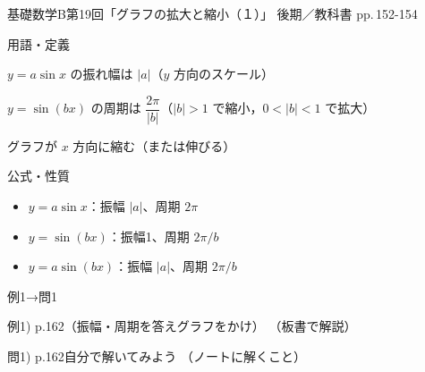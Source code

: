 \documentclass[aspectratio=43,professionalfonts,handout]{beamer}
\newcommand{\LectureNum}{19}
\newcommand{\LectureTitle}{グラフの拡大と縮小（１）}
\newcommand{\TextPages}{pp.\,152-154}
\newcommand{\CourseName}{基礎数学B}
\renewcommand{\TermName}{後期}
\begin{document}
\begin{frame}{\CourseName\quad 第\LectureNum 回「\LectureTitle 」}
  {\small \TermName\quad \TeacherName\quad ／\quad 教科書 \TextPages}

  \begin{block}{用語・定義}
  \begin{description}[labelwidth=5.5em]
    \item[\kw{振幅：$|a|$}] $y = a\sin x$ の振れ幅は $|a|$（$y$ 方向のスケール）
    \item[\kw{周期：$2\pi/|b|$}] $y = \sin(bx)$ の周期は $\dfrac{2\pi}{|b|}$（$|b| > 1$ で縮小，$0 < |b| < 1$ で拡大）
    \item[\kw{$b > 1$ で縮小、$0 < b < 1$ で拡大}] グラフが $x$ 方向に縮む（または伸びる）
  \end{description}
  \end{block}
\end{frame}

\begin{frame}{公式・性質}
  \begin{block}{}
  \begin{itemize}
    \item $y = a\sin x$：振幅 $|a|$、周期 $2\pi$
    \item $y = \sin(bx)$：振幅1、周期 $2\pi/b$
    \item $y = a\sin(bx)$：振幅 $|a|$、周期 $2\pi/b$
  \end{itemize}
  \end{block}
\end{frame}

\begin{frame}{例1→問1}
  \begin{exampleblock}{例1) p.162（振幅・周期を答えグラフをかけ）}
    （板書で解説）
  \end{exampleblock}

  \vfill

  \begin{block}{問1) p.162\quad 自分で解いてみよう}
    （ノートに解くこと）
  \end{block}
\end{frame}
\end{document}
